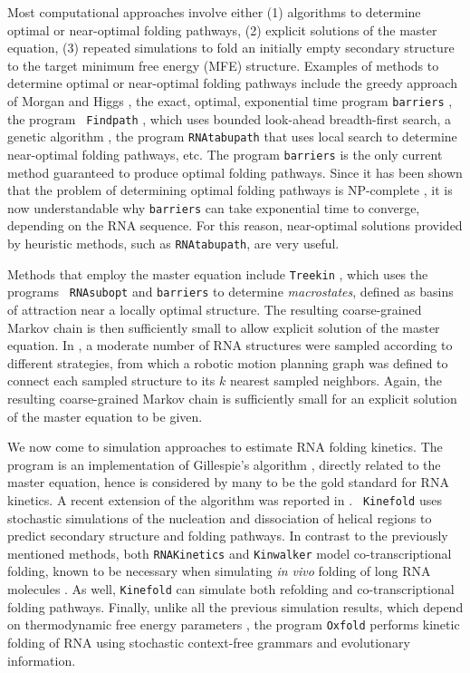 Most computational approaches involve either (1) algorithms to
determine optimal or near-optimal folding pathways, (2) explicit
solutions of the master equation, (3) repeated simulations to fold an
initially empty secondary structure to the target minimum free energy
(MFE) structure. Examples of methods to determine optimal or
near-optimal folding pathways include the greedy approach of Morgan
and Higgs \citep{morganHiggsBarrier}, the exact, optimal, exponential
time program {\tt barriers} \citep{flammHofacker}, the program {\tt
Findpath} \citep{Flamm.r01}, which uses bounded look-ahead
breadth-first search, a genetic algorithm \citep{Shapiro.jmb01}, the
program {\tt RNAtabupath} that uses local search to determine
near-optimal folding pathways, etc. The program {\tt barriers}
\citep{flammHofacker} is the only current method guaranteed to
produce optimal folding pathways. Since it has been shown that
the problem of determining optimal folding pathways is
NP-complete \citep{Thachuk.psb10}, it is now understandable why
{\tt barriers} can take exponential time to converge, depending
on the RNA sequence. For this reason, near-optimal solutions
provided by heuristic methods, such as {\tt RNAtabupath}, are very useful.

Methods that employ the master equation include {\tt Treekin}
\citep{wolfingerStadler:kinetics}, which uses the programs {\tt
RNAsubopt} \citep{wuchtyFontanaHofackerSchuster} and {\tt barriers}
\citep{flammHofacker} to determine {\em macrostates}, defined as basins
of attraction near a locally optimal structure. The resulting
coarse-grained Markov chain is then sufficiently small to allow explicit
solution of the master equation. In \citep{Tang.jcb05}, a moderate
number of RNA structures were sampled according to different
strategies, from which a robotic motion planning graph was defined
to connect each sampled structure to its $k$ nearest sampled
neighbors. Again, the resulting coarse-grained Markov chain is
sufficiently small for an explicit solution of the master equation to
be given.

We now come to simulation approaches to estimate RNA folding kinetics.
The program \kinfold \citep{flammPhD,flamm} is an implementation
of Gillespie's algorithm \citep{gillespieStochasticSimulation1},
directly related to the master equation, hence is considered by many
to be the gold standard for RNA kinetics. A recent extension of the
\kinfold algorithm was reported in \citep{Aviram.amb12}. {\tt
Kinefold} \citep{Xayaphoummine.nar05} uses stochastic simulations of
the nucleation and dissociation of helical regions to predict
secondary structure and folding pathways. In contrast to the
previously mentioned methods, both {\tt RNAKinetics}
\citep{Danilova.jbcb06} and {\tt Kinwalker} \citep{Geis.jmb08} model
co-transcriptional folding, known to be necessary when simulating
{\em in vivo} folding of long RNA molecules \citep{Lai.r13}. As well,
{\tt Kinefold} can simulate both refolding and co-transcriptional folding
pathways. Finally, unlike all the previous simulation results, which
depend on thermodynamic free energy parameters \citep{Turner.nar10},
the program {\tt Oxfold} \citep{Anderson.b13} performs kinetic folding
of RNA using stochastic context-free grammars and evolutionary
information.

